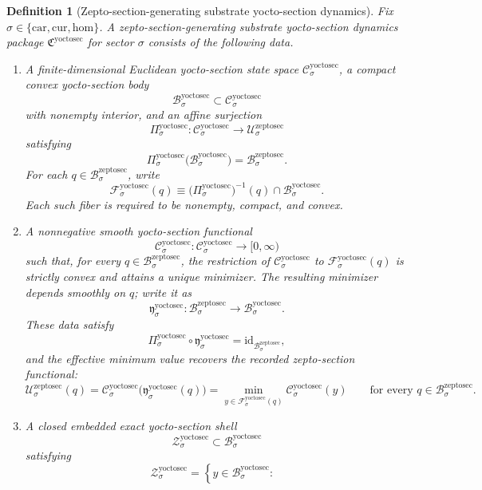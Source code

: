 \documentclass[11pt]{article}
\newcommand{\Car}{\mathrm{car}}
\newcommand{\Cur}{\mathrm{cur}}
\newcommand{\Hom}{\mathrm{hom}}
\newcommand{\ZeptoSectionSpace}[1]{\mathcal U_{#1}^{\mathrm{zeptosec}}}
\newcommand{\ZeptoSectionBody}[1]{\mathcal B_{#1}^{\mathrm{zeptosec}}}
\newcommand{\ZeptoSectionFunctional}[1]{\mathscr U_{#1}^{\mathrm{zeptosec}}}
\newcommand{\YoctoSectionPackage}{\mathfrak C^{\mathrm{yoctosec}}}
\newcommand{\YoctoSectionSpace}[1]{\mathcal C_{#1}^{\mathrm{yoctosec}}}
\newcommand{\YoctoSectionBody}[1]{\mathcal B_{#1}^{\mathrm{yoctosec}}}
\newcommand{\YoctoSectionProj}[1]{\Pi_{#1}^{\mathrm{yoctosec}}}
\newcommand{\YoctoSectionFiber}[2]{\mathcal F_{#1}^{\mathrm{yoctosec}}(#2)}
\newcommand{\YoctoSectionZeptoMin}[1]{\mathfrak y_{#1}^{\mathrm{yoctosec}}}
\newcommand{\YoctoSectionFunctional}[1]{\mathscr C_{#1}^{\mathrm{yoctosec}}}
\newcommand{\YoctoSectionShell}[1]{\mathcal Z_{#1}^{\mathrm{yoctosec}}}
\newtheorem{definition}{Definition}
\begin{document}
\begin{definition}[Zepto-section-generating substrate yocto-section dynamics]
\label{def:yoctosec}
Fix \(\sigma\in\{\Car,\Cur,\Hom\}\). A \emph{zepto-section-generating substrate yocto-section dynamics package} \(\YoctoSectionPackage\) for sector \(\sigma\) consists of the following data.
\begin{enumerate}
    \item A finite-dimensional Euclidean yocto-section state space \(\YoctoSectionSpace{\sigma}\), a compact convex yocto-section body
    \[
    \YoctoSectionBody{\sigma}\subset\YoctoSectionSpace{\sigma}
    \]
    with nonempty interior, and an affine surjection
    \[
    \YoctoSectionProj{\sigma}:\YoctoSectionSpace{\sigma}\to\ZeptoSectionSpace{\sigma}
    \]
    satisfying
    \[
    \YoctoSectionProj{\sigma}\bigl(\YoctoSectionBody{\sigma}\bigr)=\ZeptoSectionBody{\sigma}.
    \]
    For each \(q\in\ZeptoSectionBody{\sigma}\), write
    \[
    \YoctoSectionFiber{\sigma}{q}
    \equiv
    \bigl(\YoctoSectionProj{\sigma}\bigr)^{-1}(q)\cap\YoctoSectionBody{\sigma}.
    \]
    Each such fiber is required to be nonempty, compact, and convex.
    \item A nonnegative smooth yocto-section functional
    \[
    \YoctoSectionFunctional{\sigma}:\YoctoSectionSpace{\sigma}\to[0,\infty)
    \]
    such that, for every \(q\in\ZeptoSectionBody{\sigma}\), the restriction of \(\YoctoSectionFunctional{\sigma}\) to \(\YoctoSectionFiber{\sigma}{q}\) is strictly convex and attains a unique minimizer. The resulting minimizer depends smoothly on \(q\); write it as
    \[
    \YoctoSectionZeptoMin{\sigma}:\ZeptoSectionBody{\sigma}\to\YoctoSectionBody{\sigma}.
    \]
    These data satisfy
    \[
    \YoctoSectionProj{\sigma}\circ\YoctoSectionZeptoMin{\sigma}
    =
    \mathrm{id}_{\ZeptoSectionBody{\sigma}},
    \]
    and the effective minimum value recovers the recorded zepto-section functional:
    \[
    \ZeptoSectionFunctional{\sigma}(q)
    =
    \YoctoSectionFunctional{\sigma}\bigl(\YoctoSectionZeptoMin{\sigma}(q)\bigr)
    =
    \min_{y\in\YoctoSectionFiber{\sigma}{q}}
    \YoctoSectionFunctional{\sigma}(y)
    \qquad
    \text{for every }
    q\in\ZeptoSectionBody{\sigma}.
    \]
    \item A closed embedded exact yocto-section shell
    \[
    \YoctoSectionShell{\sigma}\subset\YoctoSectionBody{\sigma}
    \]
    satisfying
    \[
    \YoctoSectionShell{\sigma}
    =
    \left\{
    y\in\YoctoSectionBody{\sigma}:
    \begin{array}{l}

\end{array}\]
\end{enumerate}
\end{definition}
\end{document}
